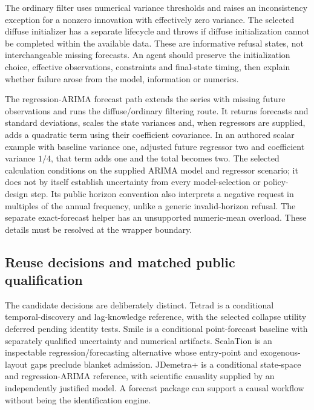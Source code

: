 The ordinary filter uses numerical variance thresholds and raises an inconsistency exception for a nonzero innovation with effectively zero variance. The selected diffuse initializer has a separate lifecycle and throws if diffuse initialization cannot be completed within the available data. These are informative refusal states, not interchangeable missing forecasts. An agent should preserve the initialization choice, effective observations, constraints and final-state timing, then explain whether failure arose from the model, information or numerics.~\citep{exec25_jdyn_jdplus}

The regression-ARIMA forecast path extends the series with missing future observations and runs the diffuse/ordinary filtering route. It returns forecasts and standard deviations, scales the state variances and, when regressors are supplied, adds a quadratic term using their coefficient covariance. In an authored scalar example with baseline variance one, adjusted future regressor two and coefficient variance $1/4$, that term adds one and the total becomes two. The selected calculation conditions on the supplied ARIMA model and regressor scenario; it does not by itself establish uncertainty from every model-selection or policy-design step. Its public horizon convention also interprets a negative request in multiples of the annual frequency, unlike a generic invalid-horizon refusal. The separate exact-forecast helper has an unsupported numeric-mean overload. These details must be resolved at the wrapper boundary.~\citep{exec25_jdyn_jdplus,exec25_jdyn_choice}

\subsection{Reuse decisions and matched public qualification}

The candidate decisions are deliberately distinct. Tetrad is a conditional temporal-discovery and lag-knowledge reference, with the selected collapse utility deferred pending identity tests. Smile is a conditional point-forecast baseline with separately qualified uncertainty and numerical artifacts. ScalaTion is an inspectable regression/forecasting alternative whose entry-point and exogenous-layout gaps preclude blanket admission. JDemetra+ is a conditional state-space and regression-ARIMA reference, with scientific causality supplied by an independently justified model. A forecast package can support a causal workflow without being the identification engine.~\citep{exec25_jdyn_choice}

